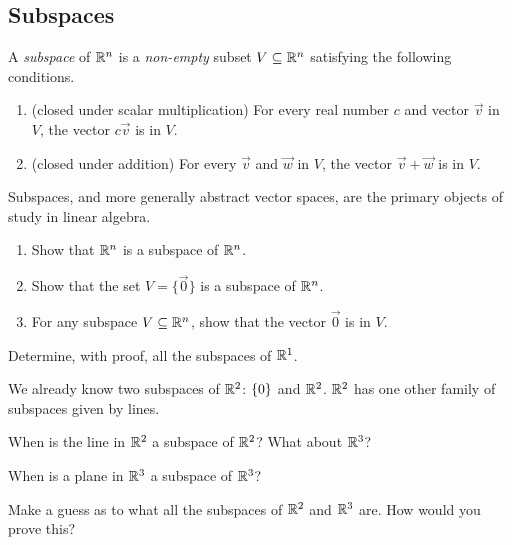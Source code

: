 \subsection{Subspaces}
\begin{definition}
  A \emph{subspace} of $\mathbb{R}^n$ is a \emph{non-empty} subset $V \subseteq \mathbb{R}^n$ satisfying the following conditions.
  \begin{enumerate}
    \item (closed under scalar multiplication) For every real number $c$ and vector $\vec{v}$ in $V$, the vector $c \vec{v}$ is in $V$.
    \item (closed under addition) For every $\vec{v}$ and $\vec{w}$ in $V$, the vector $\vec{v} + \vec{w}$ is in $V$.
  \end{enumerate}
\end{definition}
Subspaces, and more generally abstract vector spaces, are the primary objects of study in linear algebra.

\begin{qbox}
  \begin{enumerate}
    \item Show that $\mathbb{R}^n$ is a subspace of $\mathbb{R}^n$.
    \item Show that the set $V = \{\vec{0}\}$ is a subspace of $\mathbb{R}^n$.
    \item For any subspace $V \subseteq \mathbb{R}^n$, show that the vector $\vec{0}$ is in $V$.
  \end{enumerate}
\end{qbox}

\begin{qbox}
  Determine, with proof, all the subspaces of $\mathbb{R}^1$.
\end{qbox}


We already know two subspaces of $\mathbb{R}^2$: $\left\{0\right\}$ and $\mathbb{R}^2$.
$\mathbb{R}^2$ has one other family of subspaces given by lines.
\begin{qbox}
  When is the line in $\mathbb{R}^2$ a subspace of $\mathbb{R}^2$? What about $\mathbb{R}^3$?
\end{qbox}

\begin{qbox}
  When is a plane in $\mathbb{R}^3$ a subspace of $\mathbb{R}^3$?
\end{qbox}

\begin{qbox}
  Make a guess as to what all the subspaces of $\mathbb{R}^2$ and $\mathbb{R}^3$ are. How would you prove this?
\end{qbox}

